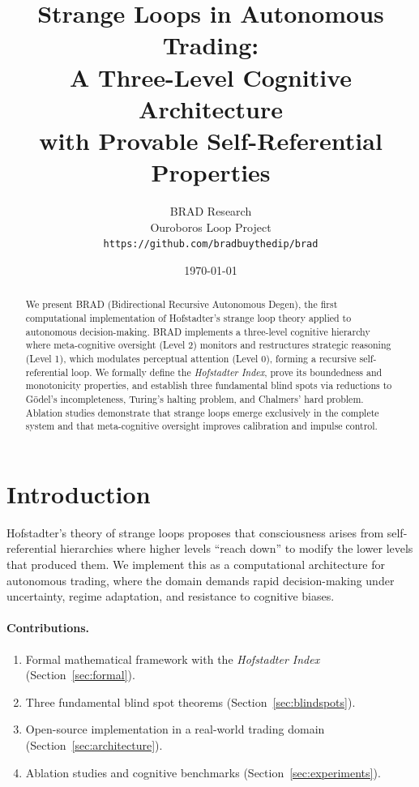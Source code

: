 \documentclass[11pt]{article}
\title{Strange Loops in Autonomous Trading:\\A Three-Level Cognitive Architecture\\with Provable Self-Referential Properties}
\author{
  BRAD Research\\
  Ouroboros Loop Project\\
  \texttt{https://github.com/bradbuythedip/brad}
}
\date{\today}
\begin{document}
\maketitle

\begin{abstract}
We present BRAD (Bidirectional Recursive Autonomous Degen), the first computational implementation of Hofstadter's strange loop theory applied to autonomous decision-making. BRAD implements a three-level cognitive hierarchy where meta-cognitive oversight (Level 2) monitors and restructures strategic reasoning (Level 1), which modulates perceptual attention (Level 0), forming a recursive self-referential loop. We formally define the \emph{Hofstadter Index}, prove its boundedness and monotonicity properties, and establish three fundamental blind spots via reductions to G\"{o}del's incompleteness, Turing's halting problem, and Chalmers' hard problem. Ablation studies demonstrate that strange loops emerge exclusively in the complete system and that meta-cognitive oversight improves calibration and impulse control.
\end{abstract}

\section{Introduction}
\label{sec:intro}

Hofstadter's theory of strange loops \citep{hofstadter1979geb, hofstadter2007loop} proposes that consciousness arises from self-referential hierarchies where higher levels ``reach down'' to modify the lower levels that produced them. We implement this as a computational architecture for autonomous trading, where the domain demands rapid decision-making under uncertainty, regime adaptation, and resistance to cognitive biases.

\paragraph{Contributions.}
\begin{enumerate}
    \item Formal mathematical framework with the \emph{Hofstadter Index} (Section~\ref{sec:formal}).
    \item Three fundamental blind spot theorems (Section~\ref{sec:blindspots}).
    \item Open-source implementation in a real-world trading domain (Section~\ref{sec:architecture}).
    \item Ablation studies and cognitive benchmarks (Section~\ref{sec:experiments}).
\end{enumerate}
\end{document}
